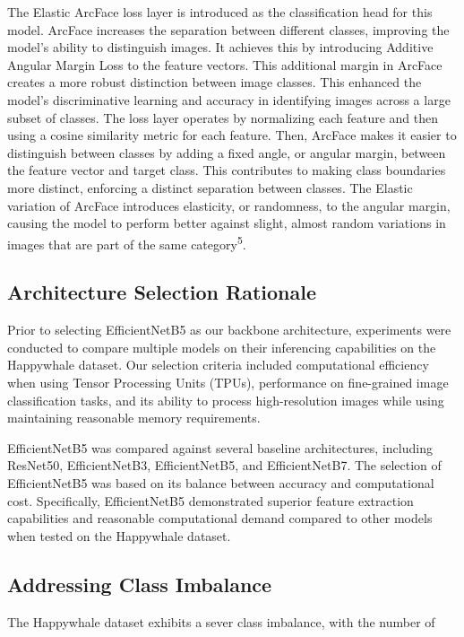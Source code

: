 \documentclass[twocolumn]{article}
\begin{document}
The Elastic ArcFace loss layer is introduced as the classification head for this model. ArcFace increases the separation between different classes, improving the model’s ability to distinguish images. It achieves this by introducing Additive Angular Margin Loss to the feature vectors. This additional margin in ArcFace creates a more robust distinction between image classes. This enhanced the model’s discriminative learning and accuracy in identifying images across a large subset of classes. The loss layer operates by normalizing each feature and then using a cosine similarity metric for each feature. Then, ArcFace makes it easier to distinguish between classes by adding a fixed angle, or angular margin, between the feature vector and target class. This contributes to making class boundaries more distinct, enforcing a distinct separation between classes. The Elastic variation of ArcFace introduces elasticity, or randomness, to the angular margin, causing the model to perform better against slight, almost random variations in images that are part of the same category\textsuperscript{5}.

\subsection{Architecture Selection Rationale}

Prior to selecting EfficientNetB5 as our backbone architecture, experiments were conducted to compare multiple models on their inferencing capabilities on the Happywhale dataset. Our selection criteria included computational efficiency when using Tensor Processing Units (TPUs), performance on fine-grained image classification tasks, and its ability to process high-resolution images while using maintaining reasonable memory requirements. 

EfficientNetB5 was compared against several baseline architectures, including ResNet50, EfficientNetB3, EfficientNetB5, and EfficientNetB7. The selection of EfficientNetB5 was based on its balance between accuracy and computational cost. Specifically, EfficientNetB5 demonstrated superior feature extraction capabilities and reasonable computational demand compared to other models when tested on the Happywhale dataset.

\subsection{Addressing Class Imbalance}

The Happywhale dataset exhibits a sever class imbalance, with the number of 
\end{document}
